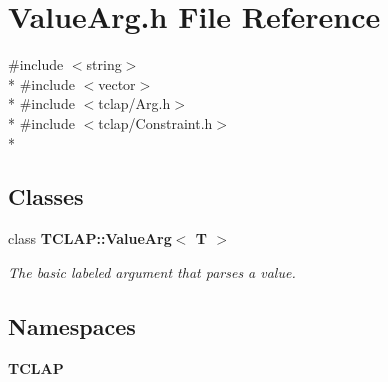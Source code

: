 \section{Value\+Arg.\+h File Reference}
\label{ValueArg_8h}
{\ttfamily \#include $<$string$>$}\\*
{\ttfamily \#include $<$vector$>$}\\*
{\ttfamily \#include $<$tclap/\+Arg.\+h$>$}\\*
{\ttfamily \#include $<$tclap/\+Constraint.\+h$>$}\\*
\subsection*{Classes}
\begin{DoxyCompactItemize}
\item 
class {\bf T\+C\+L\+A\+P\+::\+Value\+Arg$<$ T $>$}
\begin{DoxyCompactList}\small\item\em The basic labeled argument that parses a value. \end{DoxyCompactList}\end{DoxyCompactItemize}
\subsection*{Namespaces}
\begin{DoxyCompactItemize}
\item 
 {\bf T\+C\+L\+A\+P}
\end{DoxyCompactItemize}
